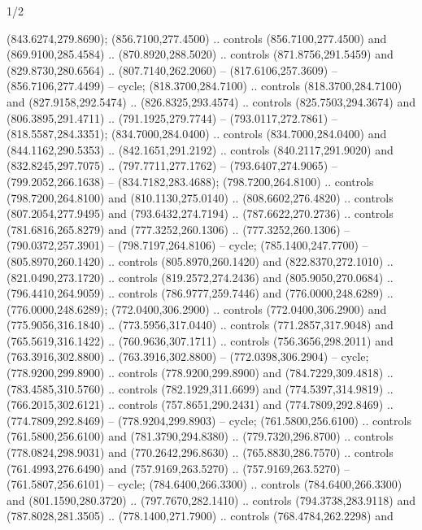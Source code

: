 \begin{flagdescription}{1/2}
\begin{scope}[xshift=0.5\flaglength,yshift=0.5\flagwidth,scale=\flagwidth/759]
\begin{scope}[y=0.8pt, x=0.8pt, yscale=-1,shift={(-720,-480)}]
\begin{scope}[draw=black,fill=c452c25,line width=0.438\lw]
  (843.6274,279.8690);
 (856.7100,277.4500) .. controls (856.7100,277.4500) and
  (869.9100,285.4584) .. (870.8920,288.5020) .. controls (871.8756,291.5459) and
  (829.8730,280.6564) .. (807.7140,262.2060) -- (817.6106,257.3609) --
  (856.7106,277.4499) -- cycle;
 (818.3700,284.7100) .. controls (818.3700,284.7100) and
  (827.9158,292.5474) .. (826.8325,293.4574) .. controls (825.7503,294.3674) and
  (806.3895,291.4711) .. (791.1925,279.7744) -- (793.0117,272.7861) --
  (818.5587,284.3351);
 (834.7000,284.0400) .. controls (834.7000,284.0400) and
  (844.1162,290.5353) .. (842.1651,291.2192) .. controls (840.2117,291.9020) and
  (832.8245,297.7075) .. (797.7711,277.1762) -- (793.6407,274.9065) --
  (799.2052,266.1638) -- (834.7182,283.4688);
 (798.7200,264.8100) .. controls (798.7200,264.8100) and
  (810.1130,275.0140) .. (808.6602,276.4820) .. controls (807.2054,277.9495) and
  (793.6432,274.7194) .. (787.6622,270.2736) .. controls (781.6816,265.8279) and
  (777.3252,260.1306) .. (777.3252,260.1306) -- (790.0372,257.3901) --
  (798.7197,264.8106) -- cycle;
 (785.1400,247.7700) -- (805.8970,260.1420) .. controls
  (805.8970,260.1420) and (822.8370,272.1010) .. (821.0490,273.1720) .. controls
  (819.2572,274.2436) and (805.9050,270.0684) .. (796.4410,264.9059) .. controls
  (786.9777,259.7446) and (776.0000,248.6289) .. (776.0000,248.6289);
 (772.0400,306.2900) .. controls (772.0400,306.2900) and
  (775.9056,316.1840) .. (773.5956,317.0440) .. controls (771.2857,317.9048) and
  (765.5619,316.1422) .. (760.9636,307.1711) .. controls (756.3656,298.2011) and
  (763.3916,302.8800) .. (763.3916,302.8800) -- (772.0398,306.2904) -- cycle;
 (778.9200,299.8900) .. controls (778.9200,299.8900) and
  (784.7229,309.4818) .. (783.4585,310.5760) .. controls (782.1929,311.6699) and
  (774.5397,314.9819) .. (766.2015,302.6121) .. controls (757.8651,290.2431) and
  (774.7809,292.8469) .. (774.7809,292.8469) -- (778.9204,299.8903) -- cycle;
 (761.5800,256.6100) .. controls (761.5800,256.6100) and
  (781.3790,294.8380) .. (779.7320,296.8700) .. controls (778.0824,298.9031) and
  (770.2642,296.8630) .. (765.8830,286.7570) .. controls (761.4993,276.6490) and
  (757.9169,263.5270) .. (757.9169,263.5270) -- (761.5807,256.6101) -- cycle;
 (784.6400,266.3300) .. controls (784.6400,266.3300) and
  (801.1590,280.3720) .. (797.7670,282.1410) .. controls (794.3738,283.9118) and
  (787.8028,281.3505) .. (778.1400,271.7900) .. controls (768.4784,262.2298) and

\end{scope}
\end{scope}
\end{scope}
\end{flagdescription}
